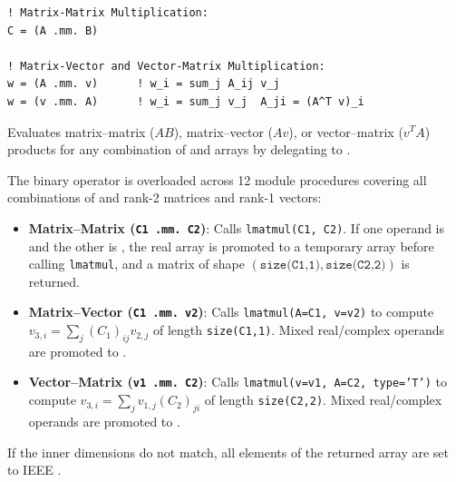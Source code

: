 
\lstset{language=[95]Fortran}
\begin{lstlisting}
! Matrix-Matrix Multiplication:
C = (A .mm. B)

! Matrix-Vector and Vector-Matrix Multiplication:
w = (A .mm. v)      ! w_i = sum_j A_ij v_j
w = (v .mm. A)      ! w_i = sum_j v_j  A_ji = (A^T v)_i
\end{lstlisting}

Evaluates matrix--matrix ($A B$), matrix--vector ($A v$), or vector--matrix ($v^T A$) products for any combination of  and  arrays by delegating to .

The binary operator  is overloaded across 12 module procedures covering all combinations of  and  rank-2 matrices and rank-1 vectors:
\begin{itemize}
  \item \textbf{Matrix--Matrix (\texttt{C1 .mm. C2})}: Calls \texttt{lmatmul(C1, C2)}. If one operand is  and the other is , the real array is promoted to a temporary  array before calling \texttt{lmatmul}, and a  matrix of shape $(\texttt{size(C1,1)}, \texttt{size(C2,2)})$ is returned.
  \item \textbf{Matrix--Vector (\texttt{C1 .mm. v2})}: Calls \texttt{lmatmul(A=C1, v=v2)} to compute $v_{3,i} = \sum_j (C_1)_{ij} v_{2,j}$ of length \texttt{size(C1,1)}. Mixed real/complex operands are promoted to .
  \item \textbf{Vector--Matrix (\texttt{v1 .mm. C2})}: Calls \texttt{lmatmul(v=v1, A=C2, type='T')} to compute $v_{3,i} = \sum_j v_{1,j} (C_2)_{ji}$ of length \texttt{size(C2,2)}. Mixed real/complex operands are promoted to .
\end{itemize}
If the inner dimensions do not match, all elements of the returned array are set to IEEE .

